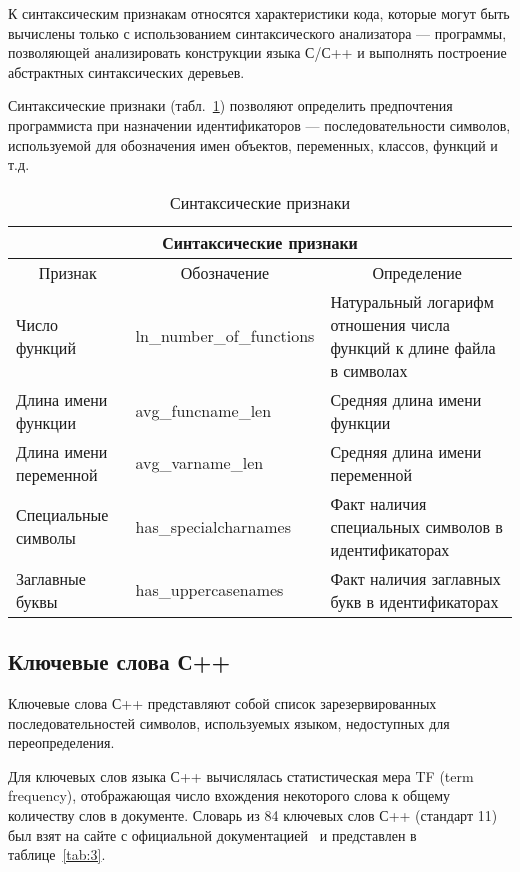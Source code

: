 К синтаксическим признакам относятся характеристики кода, которые могут быть вычислены только с использованием синтаксического анализатора --- программы, позволяющей анализировать конструкции языка С/С++ и выполнять построение абстрактных синтаксических деревьев.

Синтаксические признаки (табл.~\ref{tab:2}) позволяют определить предпочтения программиста при назначении идентификаторов --- последовательности символов, используемой для обозначения имен объектов, переменных, классов, функций и т.д.~\cite{identif}

\begin{table}[h!]
\caption{ Синтаксические признаки }
\label{tab:2}
\begin{center}
\begin{tabularx}{\linewidth}{|X|X|X|}
\hline
\multicolumn{3}{|c|}{Синтаксические признаки} \\
\hline
\multicolumn{1}{|c|}{Признак} & \multicolumn{1}{|c|}{Обозначение} & \multicolumn{1}{|c|}{Определение} \\
\hline
Число функций & ln\_number\_of\_functions & Натуральный логарифм отношения числа функций к длине файла в символах \\
\hline
Длина имени функции &  avg\_funcname\_len & Средняя длина имени функции \\
\hline
Длина имени переменной &  avg\_varname\_len & Средняя длина имени переменной \\
\hline
Специальные символы &  has\_specialcharnames & Факт наличия специальных символов в идентификаторах \\
\hline
Заглавные буквы &  has\_uppercasenames & Факт наличия заглавных букв в идентификаторах \\
\hline
\end{tabularx}
\end{center}
\end{table}

\subsection{Ключевые слова С++}\label{keycpp}

Ключевые слова С++ представляют собой список зарезервированных последовательностей символов, используемых языком, недоступных для переопределения.

Для ключевых слов языка С++ вычислялась статистическая мера TF (term frequency), отображающая число вхождения некоторого слова к общему количеству слов в документе. Словарь из 84 ключевых слов С++ (стандарт 11) был взят на сайте с официальной документацией~\cite{cppkeywords} и представлен в таблице~\ref{tab:3}.

